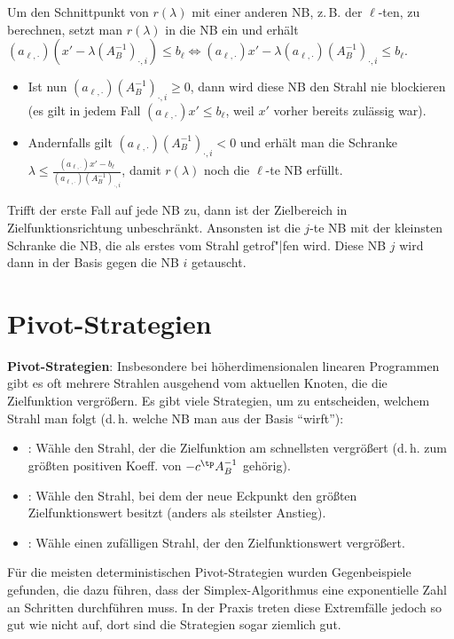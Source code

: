 Um den Schnittpunkt von $r(\lambda)$ mit einer anderen NB, z.\,B. der $\ell$-ten, zu
berechnen, setzt man $r(\lambda)$ in die NB ein und erhält
$(a_{\ell,\cdot}) (x' - \lambda (A_B^{-1})_{\cdot,i}) \le b_\ell
\iff (a_{\ell,\cdot}) x' - \lambda (a_{\ell,\cdot}) (A_B^{-1})_{\cdot,i} \le b_\ell$.
\begin{itemize}
    \item
    Ist nun $(a_{\ell,\cdot}) (A_B^{-1})_{\cdot,i} \ge 0$,
    dann wird diese NB den Strahl nie blockieren\\
    (es gilt in jedem Fall $(a_{\ell,\cdot}) x' \le b_\ell$,
    weil $x'$ vorher bereits zulässig war).

    \item
    Andernfalls gilt $(a_{\ell,\cdot}) (A_B^{-1})_{\cdot,i} < 0$ und erhält man die Schranke
    $\lambda \le \frac{(a_{\ell,\cdot}) x' - b_\ell}{(a_{\ell,\cdot}) (A_B^{-1})_{\cdot,i}}$,
    damit $r(\lambda)$ noch die $\ell$-te NB erfüllt.
\end{itemize}
Trifft der erste Fall auf jede NB zu, dann ist der Zielbereich in Zielfunktionsrichtung
unbeschränkt.
Ansonsten ist die $j$-te NB mit der kleinsten Schranke die NB, die als erstes vom Strahl
getrof"|fen wird.
Diese NB $j$ wird dann in der Basis gegen die NB $i$ getauscht.

\pagebreak

\section{%
    Pivot-Strategien%
}

\textbf{Pivot-Strategien}:
Insbesondere bei höherdimensionalen linearen Programmen gibt es oft mehrere Strahlen
ausgehend vom aktuellen Knoten, die die Zielfunktion vergrößern.
Es gibt viele Strategien, um zu entscheiden, welchem Strahl man folgt
(d.\,h. welche NB man aus der Basis "`wirft"'):
\begin{itemize}
    \item
    :
    Wähle den Strahl, der die Zielfunktion am schnellsten vergrößert
    (d.\,h. zum größten positiven Koeff. von $-c^\tp A_B^{-1}$ gehörig).

    \item
    :
    Wähle den Strahl, bei dem der neue Eckpunkt den größten Zielfunktionswert besitzt
    (anders als steilster Anstieg).

    \item
    :
    Wähle einen zufälligen Strahl, der den Zielfunktionswert vergrößert.
\end{itemize}
Für die meisten deterministischen Pivot-Strategien wurden Gegenbeispiele gefunden,
die dazu führen, dass der Simplex-Algorithmus eine exponentielle Zahl an Schritten durchführen
muss.
In der Praxis treten diese Extremfälle jedoch so gut wie nicht auf,
dort sind die Strategien sogar ziemlich gut.

